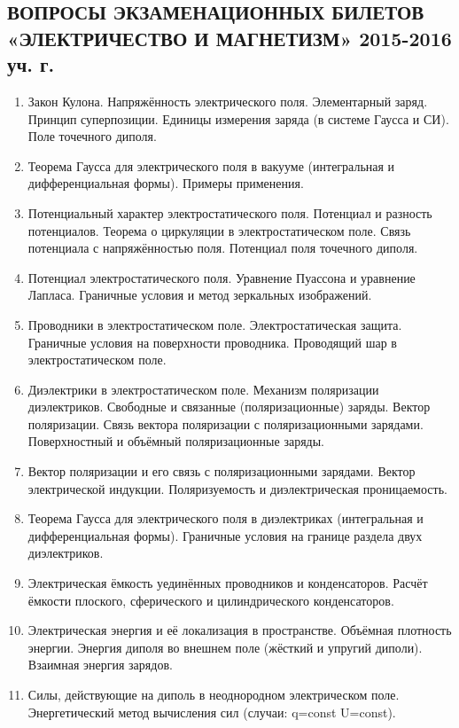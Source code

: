 \documentclass[9pt,a4paper]{article}
\begin{document}
\begin{center}
\subsection*{ВОПРОСЫ ЭКЗАМЕНАЦИОННЫХ БИЛЕТОВ \\ «ЭЛЕКТРИЧЕСТВО И МАГНЕТИЗМ» 2015-2016 уч. г.}
\end{center}
\begin{enumerate}
\item Закон Кулона. Напряжённость электрического поля. Элементарный заряд. Принцип суперпозиции. Единицы измерения заряда (в системе Гаусса и СИ). Поле точечного диполя.
\item Теорема Гаусса для электрического поля в вакууме (интегральная и дифференциальная формы). Примеры применения. 
\item Потенциальный характер электростатического поля. Потенциал и разность потенциалов. Теорема о циркуляции в электростатическом поле. Связь потенциала с напряжённостью поля. Потенциал поля точечного диполя.  
\item Потенциал электростатического поля. Уравнение Пуассона и уравнение Лапласа. Граничные условия и метод зеркальных изображений. 
\item Проводники в электростатическом поле. Электростатическая защита. Граничные условия на поверхности проводника. Проводящий шар в электростатическом поле.  
\item Диэлектрики в электростатическом поле. Механизм поляризации диэлектриков. Свободные и связанные (поляризационные) заряды. Вектор поляризации. Связь вектора поляризации с поляризационными зарядами. Поверхностный и объёмный поляризационные заряды.  
\item Вектор поляризации и его связь с поляризационными зарядами. Вектор электрической индукции. Поляризуемость и диэлектрическая проницаемость. 
\item Теорема Гаусса для электрического поля в диэлектриках (интегральная и дифференциальная формы). Граничные условия на границе раздела двух диэлектриков.  
\item Электрическая ёмкость уединённых проводников и конденсаторов. Расчёт ёмкости плоского, сферического и цилиндрического
конденсаторов.
\item Электрическая энергия и её локализация в пространстве. Объёмная плотность энергии. Энергия диполя во внешнем поле (жёсткий и
упругий диполи). Взаимная энергия зарядов.
\item Силы, действующие на диполь в неоднородном электрическом поле. Энергетический метод вычисления сил (случаи: q=const U=const).

\end{enumerate}
\end{document}
